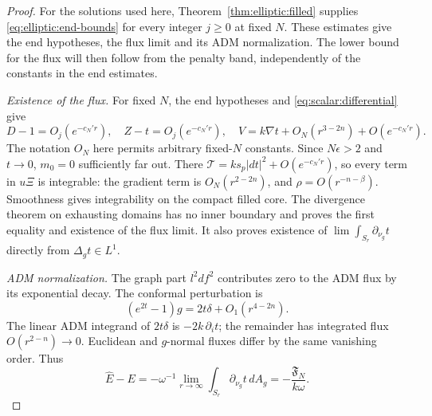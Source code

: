 \begin{proof}
For the solutions used here, Theorem~\ref{thm:elliptic:filled} supplies
\eqref{eq:elliptic:end-bounds} for every integer $j\ge0$ at fixed $N$.
These estimates give the end hypotheses, the flux limit and its ADM
normalization.  The lower bound for the flux will then follow from
the penalty band, independently of the constants in the end estimates.

\emph{Existence of the flux.} For fixed $N$, the end hypotheses and
\eqref{eq:scalar:differential} give
\[
 D-1=O_j(e^{-c_N'r}),\quad Z-t=O_j(e^{-c_N'r}),\quad
 V=k\nabla t+O_N(r^{3-2n})+O(e^{-c_N'r}).
\]
The notation $O_N$ here permits arbitrary fixed-$N$ constants.
Since $N\epsilon>2$ and $t\to0$, $m_0=0$ sufficiently far out.
There $\mathcal T=ks_p|dt|^2+O(e^{-c_N'r})$, so every term in
$u\Xi$ is integrable: the gradient term is $O_N(r^{2-2n})$, and
$\rho=O(r^{-n-\beta})$.  Smoothness gives integrability on the compact
filled core.  The divergence theorem on exhausting domains has no
inner boundary and proves the first equality and existence of the
flux limit.  It also proves existence of $\lim\int_{S_r}\partial_{\nu_g}t$
directly from $\Delta_gt\in L^1$.

\emph{ADM normalization.} The graph part $l^2df^2$ contributes zero
to the ADM flux by its
exponential decay.  The conformal perturbation is
\[
 (e^{2t}-1)g=2t\delta+O_1(r^{4-2n}).
\]
The linear ADM integrand of $2t\delta$ is $-2k\,\partial_i t$;
the remainder has integrated flux $O(r^{2-n})\to0$.  Euclidean and
$g$-normal fluxes differ by the same vanishing order.  Thus
\[
 \widehat E-E=-\omega^{-1}\lim_{r\to\infty}
                      \int_{S_r}\partial_{\nu_g}t\,dA_g
                =-\frac{\mathfrak F_N}{k\omega}.
\]


\end{proof}
